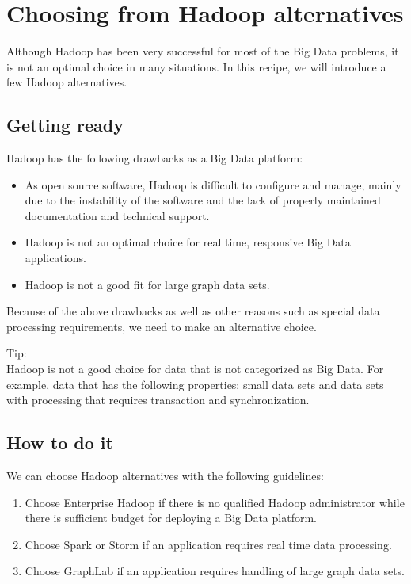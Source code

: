 \section{Choosing from Hadoop alternatives}
Although Hadoop has been very successful for most of the Big Data problems, it is not an optimal choice in many situations. In this recipe, we will introduce a few Hadoop alternatives.
\subsection*{Getting ready}
Hadoop has the following drawbacks as a Big Data platform:
\begin{itemize}
  \item As open source software, Hadoop is difficult to configure and manage, mainly due to the instability of the software and the lack of properly maintained documentation and technical support.
  \item Hadoop is not an optimal choice for real time, responsive Big Data applications.
  \item Hadoop is not a good fit for large graph data sets.
\end{itemize}

Because of the above drawbacks as well as other reasons such as special data processing requirements, we need to make an alternative choice.
\begin{info} 
Tip: \\
Hadoop is not a good choice for data that is not categorized as Big Data. For example, data that has the following properties: small data sets and data sets with processing that requires transaction and synchronization.
\end{info} 

\subsection*{How to do it}
We can choose Hadoop alternatives with the following guidelines:
\begin{enumerate}
  \item Choose Enterprise Hadoop if there is no qualified Hadoop administrator while there is sufficient budget for deploying a Big Data platform.
  \item Choose Spark or Storm if an application requires real time data processing.
  \item Choose GraphLab if an application requires handling of large graph data sets.
\end{enumerate}
